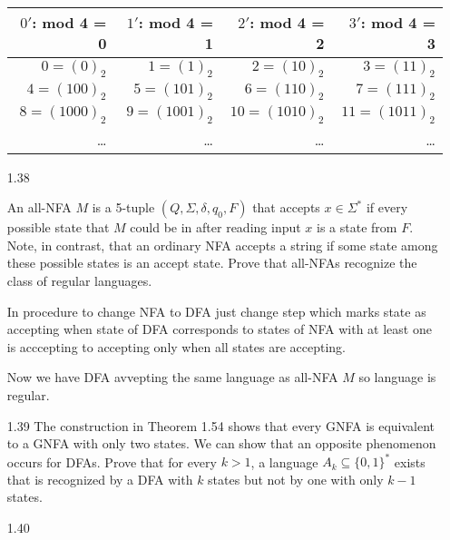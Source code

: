 \begin{enumerate}
          \begin{table}[H]
              \centering
              \begin{tabular}{|r|r|r|r|}
                  \hline
                  $0'$: mod 4 = 0      & $1'$: mod  4 = 1     & $2'$: mod 4 = 2       & $3'$: mod 4 = 3       \\
                  \hline
                  $0 = (0)_2$    & $1 = (1)_2$    & $2 = (10)_2$    & $3 = (11)_2$    \\
                  $4 = (100)_2$  & $5 = (101)_2$  & $6 = (110)_2$   & $7 = (111)_2$   \\
                  $8 = (1000)_2$ & $9 = (1001)_2$ & $10 = (1010)_2$ & $11 = (1011)_2$ \\
                  \ldots         & \ldots         & \ldots          & \ldots          \\
                  \hline
              \end{tabular}
          \end{table}

    \item [1.38]

    An all-NFA $M$ is a 5-tuple $(Q,\Sigma,\delta,q_0,F)$ that accepts $x \in \Sigma^\ast$ if every possible state that $M$ could be in after reading input $x$ is a state from $F$. Note, in contrast, that an ordinary NFA accepts a string if some state among these possible states is an accept state. Prove that all-NFAs recognize the class of regular languages.

    In procedure to change NFA to DFA just change step which marks state as accepting when state of DFA corresponds to states of NFA with at least one is acccepting to accepting only when all states are accepting.

    Now we have DFA avvepting the same language as all-NFA $M$ so language is regular.
    \item [1.39]
    The construction in Theorem 1.54 shows that every GNFA is equivalent to a GNFA with only two states. We can show that an opposite phenomenon occurs for DFAs. Prove that for every $k > 1$, a language $A_k \subseteq \{0,1\}^\ast$ exists that is recognized by a DFA with $k$ states but not by one with only $k-1$ states.
    \item [1.40]
\end{enumerate}
